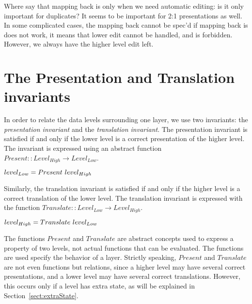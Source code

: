 \bc
Where say that mapping back is only when we need automatic editing: is it only important for duplicates? It seems to be important for 2:1 presentations as well.  In some complicated cases, the mapping back cannot be spec'd if mapping back is does not work, it means that lower edit cannot be handled, and is forbidden. However, we always have the higher level edit left.
\ec

%																
%																
%																
\section{The Presentation and Translation invariants}


In order to relate the data levels surrounding one layer, we use two invariants: the {\em presentation invariant} and the {\em translation invariant}. The presentation invariant is satisfied if and only if the lower level is a correct presentation of the higher level. The invariant is expressed using an abstract function 
$Present ::  Level_{High} \rightarrow Level_{Low}$.

\begin{small}\begin{math}
level_{Low} = Present~level_{High}\\
\end{math}\end{small}

Similarly, the translation invariant is satisfied if and only if the higher level is a correct translation of the lower level. The translation invariant is expressed with the function 
$Translate ::  Level_{Low} \rightarrow Level_{High}$.

\begin{small}\begin{math}
level_{High} = Translate~level_{Low}\\
\end{math}\end{small}

The functions $Present$ and $Translate$ are abstract concepts used to express a property of two levels, not actual functions that can be evaluated. The functions are used specify the behavior of a layer.
Strictly speaking, $Present$ and $Translate$ are not even functions but relations, since a higher level may have several correct presentations, and a lower level may have several correct translations. However, this occurs only if a level has extra state, as will be explained in Section~\ref{sect:extraState}.

